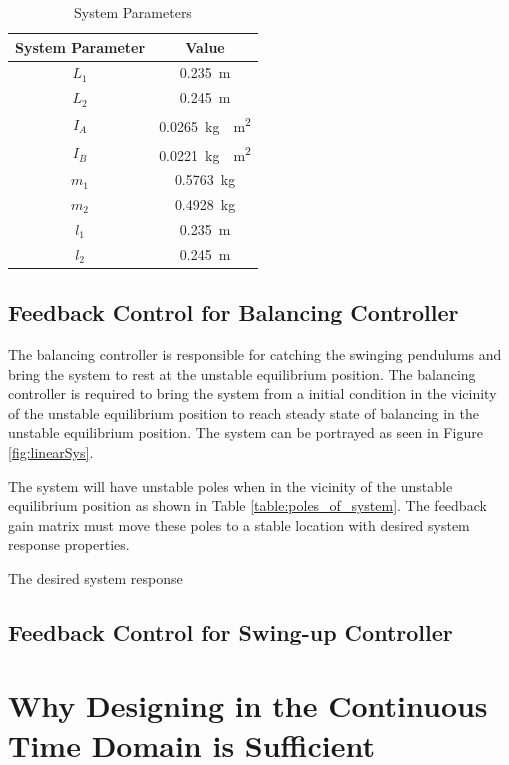 \documentclass[a4paper,12pt]{article}
\begin{document}
	
		\begin{table}[]
		\centering
		\begin{tabular}{|c|c|}
			\hline
			System Parameter & Value \\
			\hline
			\hline
			$L_{1}$ & \SI{0.235}{m} \\
			\hline
			$L_{2}$ & \SI{0.245}{m} \\ 
			\hline
			$I_{A}$ & \SI{0.0265}{kg\cdot m^2}\\
			\hline
			$I_{B}$ & \SI{0.0221}{kg\cdot m^2}\\
			\hline
			$m_{1}$ & \SI{0.5763}{kg}\\
			\hline
			$m_{2}$ & \SI{0.4928}{kg} \\
			\hline
			$l_{1}$ & \SI{0.235}{m}\\
			\hline
			$l_{2}$ & \SI{0.245}{m}\\
			\hline
		\end{tabular}
		\caption{System Parameters}
		\label{table:system_param}
	\end{table}
	
	\subsection{Feedback Control for Balancing Controller}
	
	The balancing controller is responsible for catching the swinging pendulums and bring the system to rest at the unstable equilibrium position. The balancing controller is required to bring the system from a initial condition in the vicinity of the unstable equilibrium position to reach steady state of balancing in the unstable equilibrium position. The system can be portrayed as seen in Figure \ref{fig:linearSys}.
	
	The system will have unstable poles when in the vicinity of the unstable equilibrium position as shown in Table \ref{table:poles_of_system}. The feedback gain matrix must move these poles to a stable location with desired system response properties.
	
	The desired system response 
	
	
	
	
	\subsection{Feedback Control for Swing-up Controller}

	
	\section{Why Designing in the Continuous Time Domain is Sufficient}
	
\end{document}
